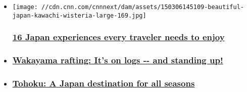\begin{itemize}
\item
  \href{/travel/article/japan-top-experiences/index.html}{}

  \texttt{[image: //cdn.cnn.com/cnnnext/dam/assets/150306145109-beautiful-japan-kawachi-wisteria-large-169.jpg]}

  \hypertarget{16-japan-experiences-every-traveler-needs-to-enjoy}{%
  \subsubsection{\texorpdfstring{\href{/travel/article/japan-top-experiences/index.html}{16
  Japan experiences every traveler needs to
  enjoy}}{16 Japan experiences every traveler needs to enjoy}}\label{16-japan-experiences-every-traveler-needs-to-enjoy}}
\item
  \hypertarget{wakayama-rafting-its-on-logs----and-standing-up}{%
  \subsubsection{\texorpdfstring{\href{/travel/article/wakayama-rafting/index.html}{Wakayama
  rafting: It's on logs -\/- and standing
  up!}}{Wakayama rafting: It's on logs -\/- and standing up!}}\label{wakayama-rafting-its-on-logs----and-standing-up}}
\item
  \hypertarget{tohoku-a-japan-destination-for-all-seasons-}{%
  \subsubsection{\texorpdfstring{\href{/travel/article/top-travel-experiences-tohoku-japan/index.html}{Tohoku:
  A Japan destination for all seasons
  }}{Tohoku: A Japan destination for all seasons }}\label{tohoku-a-japan-destination-for-all-seasons-}}
\end{itemize}

